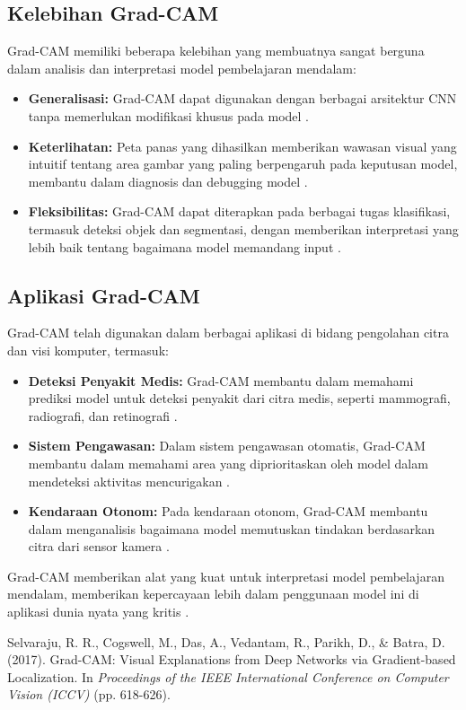 \subsection{Kelebihan Grad-CAM}

Grad-CAM memiliki beberapa kelebihan yang membuatnya sangat berguna dalam analisis dan interpretasi model pembelajaran mendalam:

\begin{itemize}
    \item \textbf{Generalisasi:} Grad-CAM dapat digunakan dengan berbagai arsitektur CNN tanpa memerlukan modifikasi khusus pada model \cite{selvaraju2017grad}.
    \item \textbf{Keterlihatan:} Peta panas yang dihasilkan memberikan wawasan visual yang intuitif tentang area gambar yang paling berpengaruh pada keputusan model, membantu dalam diagnosis dan debugging model \cite{selvaraju2017grad}.
    \item \textbf{Fleksibilitas:} Grad-CAM dapat diterapkan pada berbagai tugas klasifikasi, termasuk deteksi objek dan segmentasi, dengan memberikan interpretasi yang lebih baik tentang bagaimana model memandang input \cite{selvaraju2017grad}.
\end{itemize}

\subsection{Aplikasi Grad-CAM}

Grad-CAM telah digunakan dalam berbagai aplikasi di bidang pengolahan citra dan visi komputer, termasuk:

\begin{itemize}
    \item \textbf{Deteksi Penyakit Medis:} Grad-CAM membantu dalam memahami prediksi model untuk deteksi penyakit dari citra medis, seperti mammografi, radiografi, dan retinografi \cite{selvaraju2017grad}.
    \item \textbf{Sistem Pengawasan:} Dalam sistem pengawasan otomatis, Grad-CAM membantu dalam memahami area yang diprioritaskan oleh model dalam mendeteksi aktivitas mencurigakan \cite{selvaraju2017grad}.
    \item \textbf{Kendaraan Otonom:} Pada kendaraan otonom, Grad-CAM membantu dalam menganalisis bagaimana model memutuskan tindakan berdasarkan citra dari sensor kamera \cite{selvaraju2017grad}.
\end{itemize}

Grad-CAM memberikan alat yang kuat untuk interpretasi model pembelajaran mendalam, memberikan kepercayaan lebih dalam penggunaan model ini di aplikasi dunia nyata yang kritis \cite{selvaraju2017grad}.

\begin{thebibliography}{9}

 Selvaraju, R. R., Cogswell, M., Das, A., Vedantam, R., Parikh, D., \& Batra, D. (2017). Grad-CAM: Visual Explanations from Deep Networks via Gradient-based Localization. In \textit{Proceedings of the IEEE International Conference on Computer Vision (ICCV)} (pp. 618-626).

\end{thebibliography}

